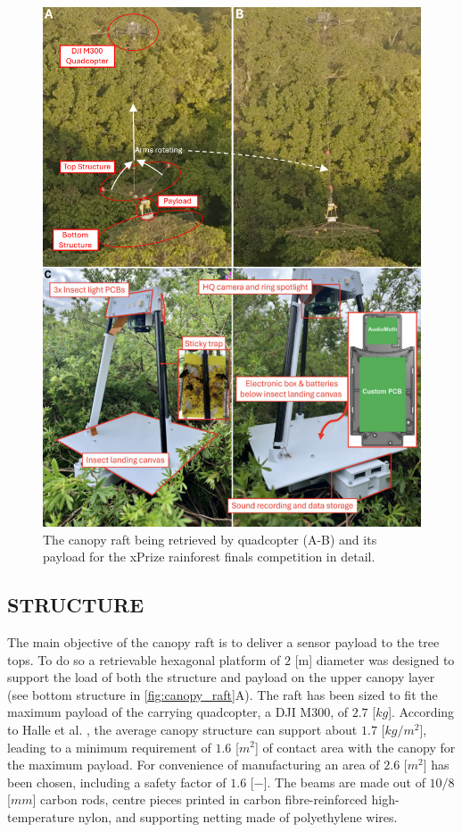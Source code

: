 \begin{figure}
    \centering
    \includegraphics[width=0.8\linewidth]{figures/canopy_raft.png}
    \caption{The canopy raft being retrieved by quadcopter (A-B) and its payload for the xPrize rainforest finals competition in detail.}
    \label{fig:canopy_raft}
\end{figure}

    \subsection{STRUCTURE}
The main objective of the canopy raft is to deliver a sensor payload to the tree tops. To do so a retrievable hexagonal platform of $2$ [m] diameter was designed to support the load of both the structure and payload on the upper canopy layer (see bottom structure in \autoref{fig:canopy_raft}A). The raft has been sized to fit the maximum payload of the carrying quadcopter, a DJI M300, of $2.7$ [$kg$]. According to Halle et al. \cite{halle2000}, the average canopy structure can support about $1.7$ [$kg/m^{2}$], leading to a minimum requirement of $1.6$ [$m^2$] of contact area with the canopy for the maximum payload. For convenience of manufacturing an area of $2.6$ [$m^2$] has been chosen, including a safety factor of $1.6$ [$-$]. The beams are made out of $10/8$ [$mm$] carbon rods, centre pieces printed in carbon fibre-reinforced high-temperature nylon, and supporting netting made of polyethylene wires.

